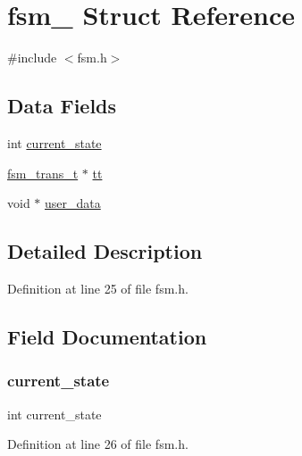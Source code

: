 \hypertarget{structfsm__}{}\section{fsm\+\_\+ Struct Reference}
\label{structfsm__}


{\ttfamily \#include $<$fsm.\+h$>$}

\subsection*{Data Fields}
\begin{DoxyCompactItemize}
\item 
int \mbox{\hyperlink{structfsm___a412684a98bd841cd75d9a7d6cfc6cd91}{current\+\_\+state}}
\item 
\mbox{\hyperlink{fsm_8h_a6b1de28e7a9f91913bb0499e2584b5ac}{fsm\+\_\+trans\+\_\+t}} $\ast$ \mbox{\hyperlink{structfsm___aa3e8c46cf7d518a83b9655e9ec64b252}{tt}}
\item 
void $\ast$ \mbox{\hyperlink{structfsm___a0f53d287ac7c064d1a49d4bd93ca1cb9}{user\+\_\+data}}
\end{DoxyCompactItemize}


\subsection{Detailed Description}


Definition at line 25 of file fsm.\+h.



\subsection{Field Documentation}
\mbox{\label{structfsm___a412684a98bd841cd75d9a7d6cfc6cd91}} 
\subsubsection{\texorpdfstring{current\+\_\+state}{current\_state}}
{\footnotesize\ttfamily int current\+\_\+state}



Definition at line 26 of file fsm.\+h.

\mbox{\label{structfsm___aa3e8c46cf7d518a83b9655e9ec64b252}} 
